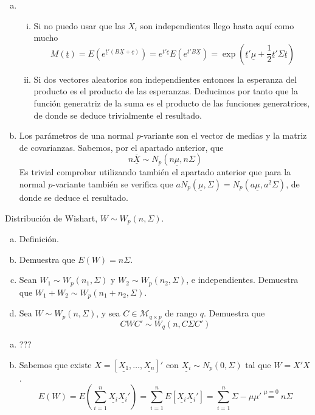 \documentclass[twoside]{article}
\newcommand{\media}[1]{{\overline{#1}}}
\newcommand{\muestra}[1]{{\underline{#1}}}
\newcommand{\m}[1]{{\muestra{#1}}}
\newcommand{\mX}{{\muestra{X}}}
\begin{document}
\begin{solucion}
\begin{enumerate}[(a)]
\item 
\begin{enumerate}[i.]
\item Si no puedo usar que las $X_i$ son independientes llego hasta aquí como mucho
\[ M(\m{t}) = E\left(e^{\m{t}'(B\mX+\muestra{c})}\right) = e^{t'\muestra{c}}E\left(e^{t'B\mX}\right) = \exp\left(\m{t}'\m{μ} + \frac{1}{2}\m{t}'Σ\m{t}\right)\]
\item Si dos vectores aleatorios son independientes entonces la esperanza del producto es el producto de las esperanzas. Deducimos por tanto que la función generatriz de la suma es el producto de las funciones generatrices, de donde se deduce trivialmente el resultado.
\end{enumerate}
\item Los parámetros de una normal $p$-variante son el vector de medias y la matriz de covarianzas. Sabemos, por el apartado anterior, que 
$$
n\media{\mX}\sim N_p(n\muestra{\mu},n\Sigma)
$$
Es trivial comprobar utilizando también el apartado anterior que para la normal $p$-variante también se verifica que $a N_p(\muestra{\mu},\Sigma)= N_p(a\muestra{\mu},a^2\Sigma)$, de donde se deduce el resultado.
\end{enumerate}
\end{solucion}
\newpage

\begin{ejercicio}{1.3}
Distribución de Wishart, $W \sim W_p(n,Σ)$.
\begin{enumerate}[(a)]
\item Definición.
\item Demuestra que $E(W) = nΣ$.
\item Sean $W_1 \sim W_p(n_1,Σ)$ y $W_2 \sim W_p(n_2,Σ)$, e independientes. Demuestra que $W_1 + W_2 \sim W_p(n_1+n_2,Σ)$.
\item Sea $W \sim W_p(n,Σ)$, y sea $C \in \mathcal{M}_{q\times p}$ de rango $q$. Demuestra que
\[ C W C' \sim W_q(n, CΣC') \]
\end{enumerate}
\end{ejercicio}
\begin{solucion}
\begin{enumerate}[(a)]
\item ???
\item Sabemos que existe $X=[\muestra{X_1},\dotsc,\muestra{X_n}]'$ con $\muestra{X_i}\sim N_p(0,\Sigma)$ tal que $W=X'X$.
$$
E(W)= E\left(\sum_{i=1}^n \muestra{X_i}\muestra{X_i}'\right) = \sum_{i=1}^n E[\muestra{X_i}\muestra{X_i}'] = \sum_{i=1}^n \Sigma-\mu\mu' \overset{\mu=0}{=} n\Sigma
$$
\end{enumerate}
\end{solucion}
\newpage
\end{document}
